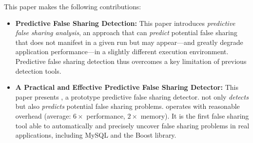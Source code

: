 This paper makes the following contributions:

\begin{itemize}


\item
\textbf{Predictive False Sharing Detection:} This paper introduces \emph{predictive false sharing analysis}, an approach that can \emph{predict} potential false sharing that does not manifest in a given run but may appear---and greatly degrade application performance---in a slightly different execution environment. 
Predictive false sharing detection thus overcomes a key limitation of previous detection tools.


\item
\textbf{A Practical and Effective Predictive False Sharing Detector:} 
This paper presents \Predator{}, a prototype predictive false sharing detector. \Predator{} not only \emph{detects} but also \emph{predicts} potential false sharing problems.
\Predator{} operates with reasonable overhead (average: $6\times$ performance, $2\times$ memory). It is the first false sharing tool able to automatically and precisely uncover
false sharing problems in real applications, including 
MySQL and the Boost library.

\end{itemize}

